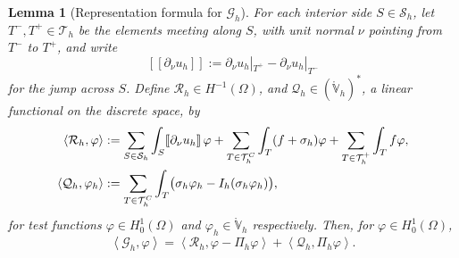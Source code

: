 \documentclass[12pt]{amsart}
\numberwithin{equation}{section}
\theoremstyle{plain}
\newtheorem{lemma}[theorem]{Lemma}
\theoremstyle{definition}
\theoremstyle{remark}
\newcommand{\Om}{\Omega}
\newcommand{\Th}{\mathcal{T}_h}
\newcommand{\Vhr}{\mathring{\mathbb{V}}_h}
\newcommand{\Sh}{\mathcal{S}_h}
\newcommand{\Ih}{I_h}
\newcommand{\Pih}{\Pi_h}
\newcommand{\Thplus}{\Th^+}
\newcommand{\ThC}{\Th^C}
\newcommand{\Gh}{\mathcal{G}_h}
\newcommand{\Rh}{\mathcal{R}_h}
\newcommand{\Qh}{\mathcal{Q}_h}
\newcommand{\jump}[1]{[\![#1]\!]}
\begin{document}
\begin{lemma}[Representation formula for $\Gh$]
\label{lem:Gh-repn}
For each interior side $S \in \Sh$, let $T^-,T^+ \in \Th$ be the elements meeting along $S$, with unit normal $\nu$ pointing from $T^-$ to $T^+$, and write
\begin{equation}
\label{eq:jump}
  \jump{\partial_\nu u_h} := \partial_\nu u_h|_{T^+} - \partial_\nu u_h|_{T^-}
\end{equation}
for the jump across $S$.  Define $\Rh \in H^{-1}(\Om)$, and $\Qh \in (\Vhr)^*$, a linear functional on the discrete space, by
\begin{align}
\label{eq:RhQh}
  \left<\Rh,\varphi\right> &:= \sum_{S\in\Sh}\int_S \jump{\partial_\nu u_h}\,\varphi + \sum_{T\in\ThC}\int_T (f+\sigma_h)\varphi + \sum_{T\in\Thplus}\int_T f\varphi, \\
  \left<\Qh,\varphi_h\right> &:= \sum_{T\in\ThC}\int_T \bigl(\sigma_h\varphi_h - \Ih(\sigma_h\varphi_h)\bigr), \notag
\end{align}
for test functions $\varphi \in H_0^1(\Om)$ and $\varphi_h \in \Vhr$ respectively.  Then, for $\varphi \in H_0^1(\Om)$,
\begin{equation}
\label{eq:Gh-repn}
  \left<\Gh,\varphi\right> = \left<\Rh,\varphi-\Pih\varphi\right> + \left<\Qh,\Pih\varphi\right>.
\end{equation}
\end{lemma}
\end{document}
